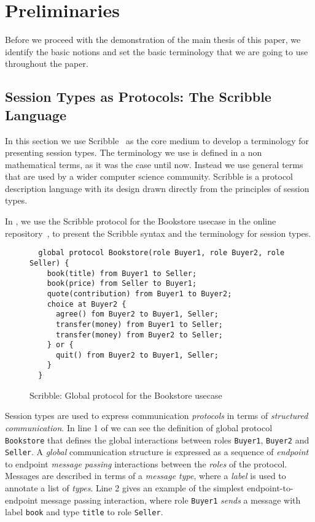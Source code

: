 \section{Preliminaries}

Before we proceed with the demonstration of the main thesis
of this paper, we identify the basic notions and set the basic
terminology that we are going to use throughout the paper.

\subsection{Session Types as Protocols: The Scribble Language}

In this section we use Scribble~\cite{scribble} as the core
medium to develop a terminology for presenting session types.
The terminology we use is defined in a non mathematical terms,
as it was the case until now. Instead we use general terms
that are used by a wider computer science community.
Scribble is a protocol description language with its design
drawn directly from the principles of session types.

In , we use the Scribble protocol for the
Bookstore usecase in the online repository~\cite{usecase_repository},
to present the Scribble syntax and the terminology for session types.

\begin{figure}[t]
\begin{lstlisting}
  global protocol Bookstore(role Buyer1, role Buyer2, role Seller) {
    book(title) from Buyer1 to Seller;
    book(price) from Seller to Buyer1;
    quote(contribution) from Buyer1 to Buyer2;
    choice at Buyer2 {
      agree() fom Buyer2 to Buyer1, Seller;
      transfer(money) from Buyer1 to Seller;
      transfer(money) from Buyer2 to Seller;
    } or {
      quit() from Buyer2 to Buyer1, Seller;
    }
  }
\end{lstlisting}
\caption{Scribble: Global protocol for the Bookstore usecase}
\label{fig:scribble_bs}
\end{figure}



Session types are used to express communication
{\em protocols} in terms of {\em structured communication}.
In line 1 of  we can see the definition 
of global protocol \lstinline|Bookstore| that defines 
the global interactions between roles \lstinline|Buyer1|,
\lstinline|Buyer2| and \lstinline|Seller|.
A {\em global} communication structure is expressed 
as a sequence of {\em endpoint} to endpoint {\em message passing}
interactions between the {\em roles} of the protocol.
Messages are described in terms of a {\em message type},
where  a {\em label} is used to annotate a list
of {\em types}.
Line 2 gives an example of the simplest endpoint-to-endpoint message
passing interaction,
where role \lstinline|Buyer1| {\em sends} a message with
label \lstinline|book| and type \lstinline|title| to role
\lstinline{Seller}.

